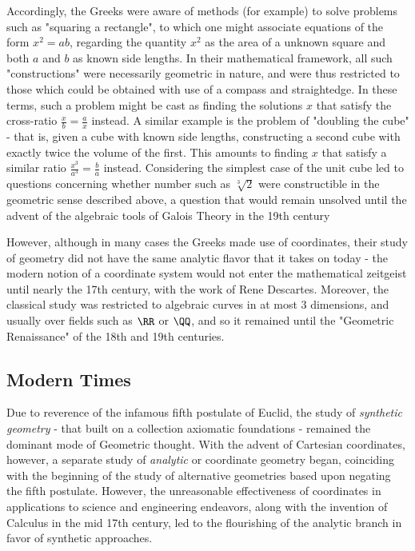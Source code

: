 \documentclass[]{article}
\begin{document}
Accordingly, the Greeks were aware of methods (for example) to solve
problems such as "squaring a rectangle", to which one might associate
equations of the form \(x^2 = ab\), regarding the quantity \(x^2\) as
the area of a unknown square and both \(a\) and \(b\) as known side
lengths. In their mathematical framework, all such "constructions" were
necessarily geometric in nature, and were thus restricted to those which
could be obtained with use of a compass and straightedge. In these
terms, such a problem might be cast as finding the solutions \(x\) that
satisfy the cross-ratio \(\frac{x}{b} = \frac{a}{x}\) instead. A similar
example is the problem of "doubling the cube" - that is, given a cube
with known side lengths, constructing a second cube with exactly twice
the volume of the first. This amounts to finding \(x\) that satisfy a
similar ratio \(\frac{x^3}{a^3} = \frac{b}{a}\) instead. Considering the
simplest case of the unit cube led to questions concerning whether
number such as \(\sqrt[3]{2}\) were constructible in the geometric sense
described above, a question that would remain unsolved until the advent
of the algebraic tools of Galois Theory in the 19th century

However, although in many cases the Greeks made use of coordinates,
their study of geometry did not have the same analytic flavor that it
takes on today - the modern notion of a coordinate system would not
enter the mathematical zeitgeist until nearly the 17th century, with the
work of Rene Descartes. Moreover, the classical study was restricted to
algebraic curves in at most 3 dimensions, and usually over fields such
as \(\RR\) or \(\QQ\), and so it remained until the "Geometric
Renaissance" of the 18th and 19th centuries.

\subsection{Modern Times}\label{header-n28}

Due to reverence of the infamous fifth postulate of Euclid, the study of
\emph{synthetic geometry} - that built on a collection axiomatic
foundations - remained the dominant mode of Geometric thought. With the
advent of Cartesian coordinates, however, a separate study of
\emph{analytic} or coordinate geometry began, coinciding with the
beginning of the study of alternative geometries based upon negating the
fifth postulate. However, the unreasonable effectiveness of coordinates
in applications to science and engineering endeavors, along with the
invention of Calculus in the mid 17th century, led to the flourishing of
the analytic branch in favor of synthetic approaches.
\end{document}
